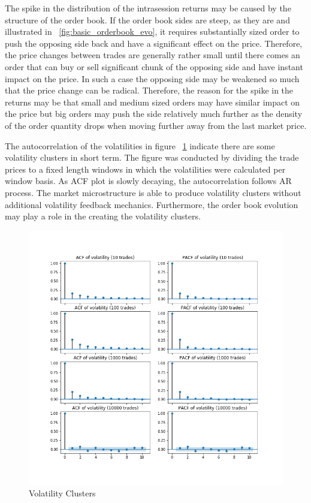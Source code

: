 The spike in the distribution of the intrasession returns may be caused by the structure of the order book. If the order book 
sides are steep, as they are and illustrated in ~\ref{fig:basic_orderbook_evo}, it requires substantially sized 
order to push the opposing side back and have a significant effect on the price. Therefore, the price changes between trades 
are generally rather small until there comes an order that can buy or sell significant chunk of the opposing side and have 
instant impact on the price. In such a case the opposing side may be weakened so much that the price change can be radical. 
Therefore, the reason for the spike in the returns may be that small and medium sized orders may have similar impact on the 
price but big orders may push the side relatively much further as the density of the order quantity drops when moving 
further away from the last market price.

The autocorrelation of the volatilities in figure ~\ref{fig:basic_volaclusters}
indicate there are some volatility clusters in short term. The figure was conducted by
dividing the trade prices to a fixed length windows in which the volatilities were calculated per
window basis. As ACF plot is slowly decaying, the autocorrelation follows AR process. The market 
microstructure is able to produce volatility clusters without additional volatility feedback mechanics.
Furthermore, the order book evolution may play a role in the creating the volatility clusters.

\begin{figure}
    \includegraphics[width=\linewidth]{plots/basic_volaclusters_intra.png}
    \caption{Volatility Clusters}
    \label{fig:basic_volaclusters}
\end{figure}

